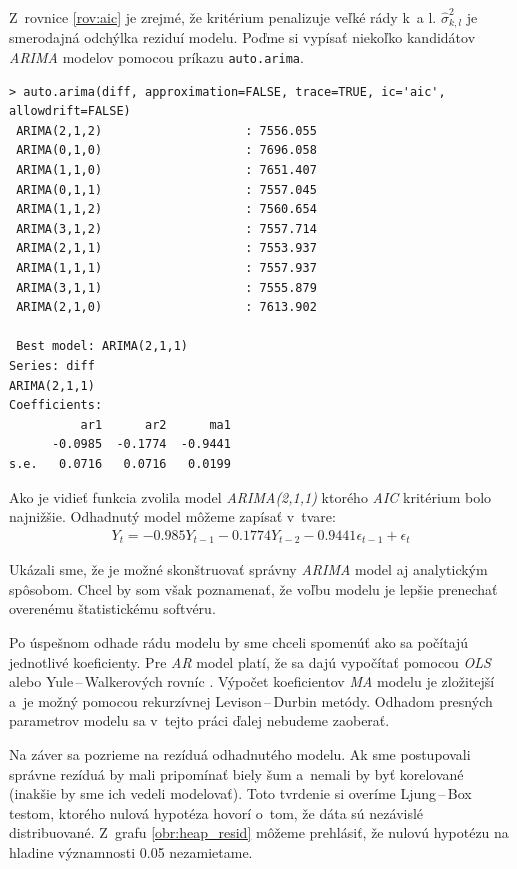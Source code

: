 \documentclass[12pt,a4paper,oneside,final]{article}
\theoremstyle{definition}
\theoremstyle{remark}
\numberwithin{equation}{section}
\begin{document}
Z~rovnice \ref{rov:aic} je zrejmé, že kritérium penalizuje veľké rády k~a l. 
$\hat{\sigma}^{2}_{k,l}$ je smerodajná odchýlka reziduí modelu. 
Poďme si vypísať niekoľko kandidátov \emph{ARIMA} modelov pomocou príkazu
\texttt{auto.arima}.

\begin{minipage}{\linewidth}
\begingroup
\fontsize{9pt}{7pt}\selectfont %
\begin{verbatim}
> auto.arima(diff, approximation=FALSE, trace=TRUE, ic='aic', allowdrift=FALSE)
 ARIMA(2,1,2)                    : 7556.055
 ARIMA(0,1,0)                    : 7696.058
 ARIMA(1,1,0)                    : 7651.407
 ARIMA(0,1,1)                    : 7557.045
 ARIMA(1,1,2)                    : 7560.654
 ARIMA(3,1,2)                    : 7557.714
 ARIMA(2,1,1)                    : 7553.937
 ARIMA(1,1,1)                    : 7557.937
 ARIMA(3,1,1)                    : 7555.879
 ARIMA(2,1,0)                    : 7613.902

 Best model: ARIMA(2,1,1)                    
Series: diff 
ARIMA(2,1,1)                    
Coefficients:
          ar1      ar2      ma1
      -0.0985  -0.1774  -0.9441
s.e.   0.0716   0.0716   0.0199
\end{verbatim}
\endgroup
\end{minipage}

Ako je vidieť funkcia zvolila model \emph{ARIMA(2,1,1)} ktorého \emph{AIC} kritérium bolo najnižšie.
Odhadnutý model môžeme zapísať v~tvare:
\begin{eqnarray} \label{rov:arima_model}
    Y_t = -0.985 Y_{t-1} - 0.1774 Y_{t-2} -0.9441\epsilon_{t-1} + \epsilon_{t}
\end{eqnarray}

Ukázali sme, že je možné skonštruovať správny \emph{ARIMA} model aj analytickým spôsobom. 
Chcel by som však poznamenať, že voľbu modelu je lepšie prenechať overenému 
štatistickému softvéru. 

Po úspešnom odhade rádu modelu by sme chceli spomenúť ako sa počítajú jednotlivé
koeficienty. Pre \emph{AR} model platí, že sa dajú vypočítať pomocou \emph{OLS} alebo Yule\,--\,Walkerových
rovníc \cite{brockwell_ts}. Výpočet koeficientov \emph{MA} modelu je zložitejší a~je 
možný pomocou rekurzívnej Levison\,--\,Durbin metódy.
Odhadom presných parametrov modelu sa v~tejto práci ďalej nebudeme zaoberať.  

Na záver sa pozrieme na rezíduá odhadnutého modelu. Ak sme postupovali správne rezíduá by
mali pripomínať biely šum a~nemali by byť korelované (inakšie by sme ich
vedeli modelovať). Toto tvrdenie si overíme Ljung\,--\,Box testom, ktorého nulová hypotéza
hovorí o~tom, že dáta sú nezávislé distribuované. Z~grafu \ref{obr:heap_resid} môžeme
prehlásiť, že nulovú hypotézu na hladine významnosti 0.05 nezamietame.
\end{document}
